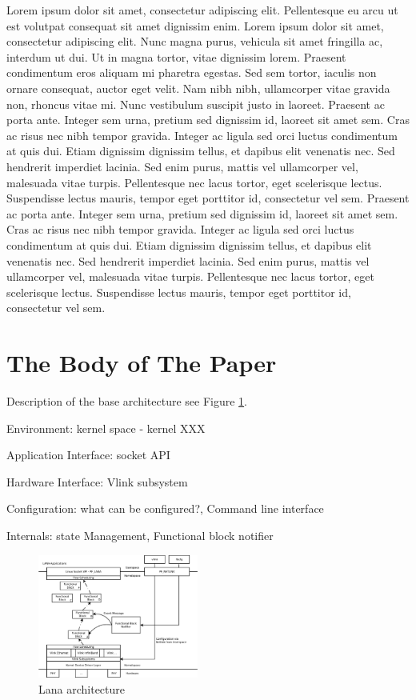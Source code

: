 \documentclass{sig-alternate}
\begin{document}
 Lorem ipsum dolor sit amet, consectetur adipiscing elit. Pellentesque eu arcu ut est volutpat consequat sit amet dignissim enim. Lorem ipsum dolor sit amet, consectetur adipiscing elit. Nunc magna purus, vehicula sit amet fringilla ac, interdum ut dui. Ut in magna tortor, vitae dignissim lorem. Praesent condimentum eros aliquam mi pharetra egestas. Sed sem tortor, iaculis non ornare consequat, auctor eget velit. Nam nibh nibh, ullamcorper vitae gravida non, rhoncus vitae mi. Nunc vestibulum suscipit justo in laoreet. Praesent ac porta ante. Integer sem urna, pretium sed dignissim id, laoreet sit amet sem. Cras ac risus nec nibh tempor gravida. Integer ac ligula sed orci luctus condimentum at quis dui. Etiam dignissim dignissim tellus, et dapibus elit venenatis nec. Sed hendrerit imperdiet lacinia. Sed enim purus, mattis vel ullamcorper vel, malesuada vitae turpis. Pellentesque nec lacus tortor, eget scelerisque lectus. Suspendisse lectus mauris, tempor eget porttitor id, consectetur vel sem. 
Praesent ac porta ante. Integer sem urna, pretium sed dignissim id, laoreet sit amet sem. Cras ac risus nec nibh tempor gravida. Integer ac ligula sed orci luctus condimentum at quis dui. Etiam dignissim dignissim tellus, et dapibus elit venenatis nec. Sed hendrerit imperdiet lacinia. Sed enim purus, mattis vel ullamcorper vel, malesuada vitae turpis. Pellentesque nec lacus tortor, eget scelerisque lectus. Suspendisse lectus mauris, tempor eget porttitor id, consectetur vel sem. 


\section{The Body of The Paper}

Description of the base architecture see Figure \ref{fig:architecture}.
\begin{compactitem}
\item Environment: kernel space - kernel XXX
\item Application Interface: socket API 
\item Hardware Interface: Vlink subsystem
\item Configuration: what can be configured?, Command line interface 
\item Internals: state Management, Functional block notifier 
\end{compactitem}

\begin{figure}
\centering
\includegraphics[width=0.47\textwidth]{figures/architecture.pdf}
\caption{Lana architecture}
\label{fig:architecture}
\end{figure}
\end{document}

